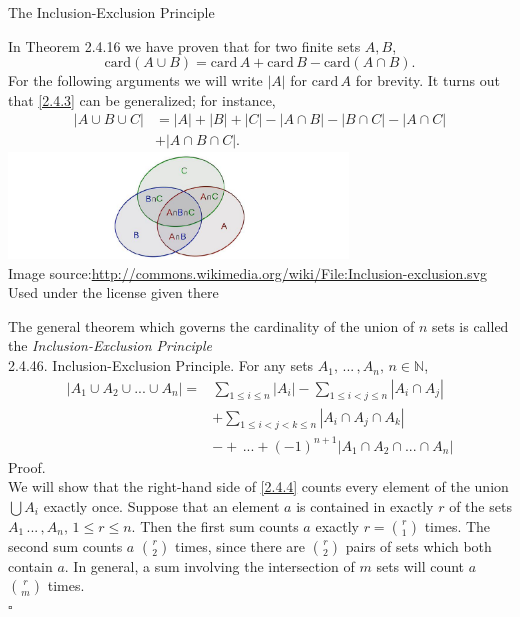 \documentclass[smaller,hyperref={CJKbookmarks=true}]{beamer}
\newcommand{\N}{\mathbb{N}} \newcommand{\Z}{\mathbb{Z}} \newcommand{\Q}{\mathbb{Q}}
\newenvironment{PROOF}{{\noindent\!\sf\alert{Proof.}}\\}{\hfill$\square$\\}
\newcounter{zhuo}[subsection]
\begin{document}
\begin{frame}{The Inclusion-Exclusion Principle}
\begin{spacing}{0.85}
In Theorem 2.4.16 we have proven that for two finite sets $A,B$,
\begin{equation}\label{2.4.3}
\text{card}(A\cup B)=\text{card}\,A+\text{card}\,B-\text{card}(A\cap B).
\end{equation}
For the following arguments we will write $|A|$ for $\text{card}\,A$ for brevity. It turns out that \eqref{2.4.3} can be generalized; for instance,
\begin{equation*}
  \begin{split}
     |A\cup B\cup C| &=|A|+|B|+|C|-|A\cap B|-|B\cap C|-|A\cap C| \\
       &+|A\cap B\cap C|.
  \end{split}
\end{equation*}
\includegraphics[width=\textwidth,height=80pt]{ie.jpg}\\
{\tiny \qquad\qquad\qquad\qquad
Image source:\url{http://commons.wikimedia.org/wiki/File:Inclusion-exclusion.svg} \quad Used under the license given there}
\end{spacing}
\newpage
\begin{spacing}{1.1}
\vspace*{9pt}
The general theorem which governs the cardinality of the union of $n$ sets is
called the \emph{Inclusion-Exclusion Principle}\\[6pt]
\alert{2.4.46. Inclusion-Exclusion Principle.} For any sets $A_1,\,...\,,A_n,\,n\in\N$,
\begin{equation}\label{2.4.4}
 \begin{split}
    |A_1\cup A_2\cup...\cup A_n|= &\sum_{1\leq i\leq n}|A_i|-\sum_{1\leq i<j\leq n}|A_i\cap A_j| \\
      &+\sum_{1\leq i<j<k\leq n}|A_i\cap A_j\cap A_k| \\
      &-+\,...+(-1)^{n+1}|A_1\cap A_2\cap...\cap A_n|
 \end{split}
\end{equation}
\newpage
\begin{PROOF}
We will show that the right-hand side of \eqref{2.4.4} counts every element of the union $\bigcup A_i$ exactly once. Suppose that an element $a$ is contained in exactly $r$ of the sets $A_1\,...\,,A_n,\,1\leq r\leq n$. Then the first sum counts $a$ exactly $r=\binom{r}{1}$ times. The second sum counts $a$ $\binom{r}{2}$ times, since there are $\binom{r}{2}$ pairs of sets which both contain $a$. In general, a sum involving the  intersection of $m$ sets will count $a$ $\binom{r}{m}$ times.\\[7pt]

\end{PROOF}
\end{spacing}
\end{frame}
\end{document}
